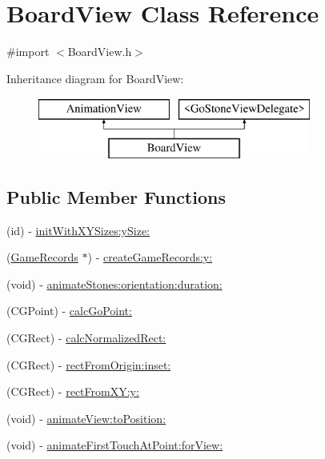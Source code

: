 \hypertarget{interface_board_view}{
\section{BoardView Class Reference}
\label{interface_board_view}
}


{\ttfamily \#import $<$BoardView.h$>$}

Inheritance diagram for BoardView:\begin{figure}[H]
\begin{center}
\leavevmode
\includegraphics[height=2.000000cm]{interface_board_view}
\end{center}
\end{figure}
\subsection*{Public Member Functions}
\begin{DoxyCompactItemize}
\item 
(id) -\/ \hyperlink{interface_board_view_a35b448e94b0afef9ef7834dd3256e3f8}{initWithXYSizes:ySize:}
\item 
(\hyperlink{interface_game_records}{GameRecords} $\ast$) -\/ \hyperlink{interface_board_view_ab81dda5b6781c4ff20bd43496456ce4c}{createGameRecords:y:}
\item 
(void) -\/ \hyperlink{interface_board_view_a4314849127b847c86e832aa56c602af8}{animateStones:orientation:duration:}
\item 
(CGPoint) -\/ \hyperlink{interface_board_view_a2404630181aa820647ec4df487f903d8}{calcGoPoint:}
\item 
(CGRect) -\/ \hyperlink{interface_board_view_a79120b9e3eb75c2aecd34cd79eb50f37}{calcNormalizedRect:}
\item 
(CGRect) -\/ \hyperlink{interface_board_view_aed7c9c69458b904491c53569a87036ac}{rectFromOrigin:inset:}
\item 
(CGRect) -\/ \hyperlink{interface_board_view_a686745940531ff731503e98da409ccbb}{rectFromXY:y:}
\item 
(void) -\/ \hyperlink{interface_board_view_a2c2ffb609dd68a01a483395a2c1b5dd6}{animateView:toPosition:}
\item 
(void) -\/ \hyperlink{interface_board_view_a0307004494273cfb10109cee4cf2d169}{animateFirstTouchAtPoint:forView:}
\end{DoxyCompactItemize}
